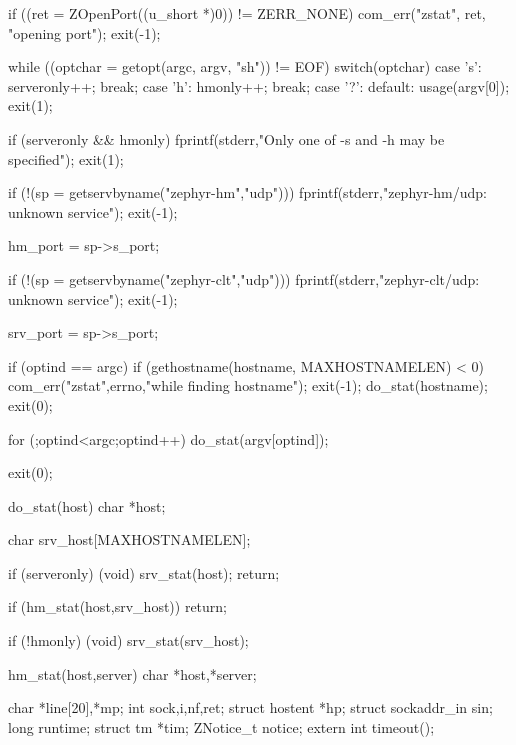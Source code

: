 \begin{code}
{        if ((ret = ZOpenPort((u_short *)0)) != ZERR_NONE) {
                com_err("zstat", ret, "opening port");
                exit(-1);
        }

        while ((optchar = getopt(argc, argv, "sh")) != EOF) {
                switch(optchar) {
                case 's':
                        serveronly++;
                        break;
                case 'h':
                        hmonly++;
                        break;
                case '?':
                default:
                        usage(argv[0]);
                        exit(1);
                }
        }

        if (serveronly && hmonly) {
                fprintf(stderr,"Only one of -s and -h may be specified\n");
                exit(1);
        }

        if (!(sp = getservbyname("zephyr-hm","udp"))) {
                fprintf(stderr,"zephyr-hm/udp: unknown service\n");
                exit(-1);
        }

        hm_port = sp->s_port;

        if (!(sp = getservbyname("zephyr-clt","udp"))) {
                fprintf(stderr,"zephyr-clt/udp: unknown service\n");
                exit(-1);
        }

        srv_port = sp->s_port;

        if (optind == argc) {
                if (gethostname(hostname, MAXHOSTNAMELEN) < 0) {
                        com_err("zstat",errno,"while finding hostname");
                        exit(-1);
                }
                do_stat(hostname);
                exit(0);
        }

        for (;optind<argc;optind++)
                do_stat(argv[optind]);

        exit(0);
}

do_stat(host)
        char *host;
{
        char srv_host[MAXHOSTNAMELEN];
        
        if (serveronly) {
                (void) srv_stat(host);
                return;
        }

        if (hm_stat(host,srv_host))
                return;

        if (!hmonly)
                (void) srv_stat(srv_host);
}

hm_stat(host,server)
        char *host,*server;
{
        char *line[20],*mp;
        int sock,i,nf,ret;
        struct hostent *hp;
        struct sockaddr_in sin;
        long runtime;
        struct tm *tim;
        ZNotice_t notice;
        extern int timeout();
        
}
\end{code}
